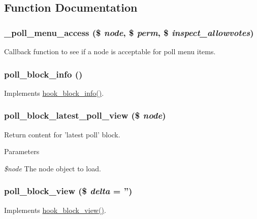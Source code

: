 \subsection{Function Documentation}
\hypertarget{poll_8module_a9f16785bb065564551ba5efdd96bf81e}{
\subsubsection[{\_\-poll\_\-menu\_\-access}]{\setlength{\rightskip}{0pt plus 5cm}\_\-poll\_\-menu\_\-access (\$ {\em node}, \/  \$ {\em perm}, \/  \$ {\em inspect\_\-allowvotes})}}
\label{poll_8module_a9f16785bb065564551ba5efdd96bf81e}
Callback function to see if a node is acceptable for poll menu items. \hypertarget{poll_8module_a60252160c13653f09164b7893b9bddc8}{
\subsubsection[{poll\_\-block\_\-info}]{\setlength{\rightskip}{0pt plus 5cm}poll\_\-block\_\-info ()}}
\label{poll_8module_a60252160c13653f09164b7893b9bddc8}
Implements \hyperlink{group__hooks_ga2bd926c3e90deeba0c3ba64fb3c64d73}{hook\_\-block\_\-info()}. \hypertarget{poll_8module_a83fcbc228432e337e7a20ec1c7f63029}{
\subsubsection[{poll\_\-block\_\-latest\_\-poll\_\-view}]{\setlength{\rightskip}{0pt plus 5cm}poll\_\-block\_\-latest\_\-poll\_\-view (\$ {\em node})}}
\label{poll_8module_a83fcbc228432e337e7a20ec1c7f63029}
Return content for 'latest poll' block.


\begin{DoxyParams}{Parameters}
\item[{\em \$node}]The node object to load. \end{DoxyParams}
\hypertarget{poll_8module_af46691a907c59444fd977935acef5166}{
\subsubsection[{poll\_\-block\_\-view}]{\setlength{\rightskip}{0pt plus 5cm}poll\_\-block\_\-view (\$ {\em delta} = {\ttfamily ''})}}
\label{poll_8module_af46691a907c59444fd977935acef5166}
Implements \hyperlink{group__hooks_gaa14092a3e74cdc57aa295100cfd6860d}{hook\_\-block\_\-view()}.

